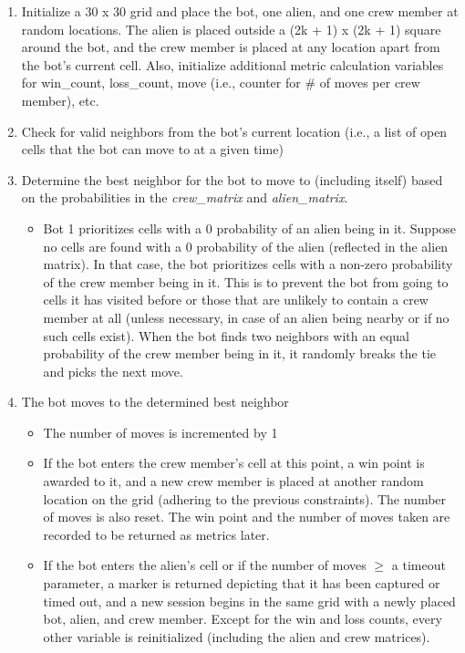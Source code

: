 \documentclass[11pt]{article}
\begin{document}
\begin{enumerate}
    \item Initialize a 30 x 30 grid and place the bot, one alien, and one crew member at random locations. The alien is placed outside a (2k + 1) x (2k + 1) square around the bot, and the crew member is placed at any location apart from the bot's current cell. Also, initialize additional metric calculation variables for win\_count, loss\_count, move (i.e., counter for \# of moves per crew member), etc.
    \item Check for valid neighbors from the bot's current location (i.e., a list of open cells that the bot can move to at a given time)
    \item Determine the best neighbor for the bot to move to (including itself) based on the probabilities in the \textit{crew\_matrix} and \textit{alien\_matrix}.
    \begin{itemize}
        \item Bot 1 prioritizes cells with a 0 probability of an alien being in it. Suppose no cells are found with a 0 probability of the alien (reflected in the alien matrix). In that case, the bot prioritizes cells with a non-zero probability of the crew member being in it. This is to prevent the bot from going to cells it has visited before or those that are unlikely to contain a crew member at all (unless necessary, in case of an alien being nearby or if no such cells exist). When the bot finds two neighbors with an equal probability of the crew member being in it, it randomly breaks the tie and picks the next move.
    \end{itemize}
    \item The bot moves to the determined best neighbor
    \begin{itemize}
        \item The number of moves is incremented by 1
        \item If the bot enters the crew member's cell at this point, a win point is awarded to it, and a new crew member is placed at another random location on the grid (adhering to the previous constraints). The number of moves is also reset. The win point and the number of moves taken are recorded to be returned as metrics later.
        \item If the bot enters the alien's cell or if the number of moves $\geq$ a timeout parameter, a marker is returned depicting that it has been captured or timed out, and a new session begins in the same grid with a newly placed bot, alien, and crew member. Except for the win and loss counts, every other variable is reinitialized (including the alien and crew matrices).

\end{itemize}
\end{enumerate}
\end{document}
